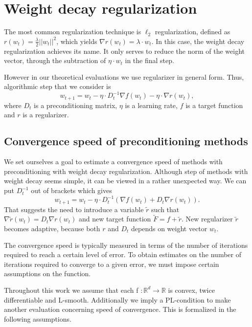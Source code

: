 \documentclass{article}
\begin{document}
\section{Weight decay regularization} 

The most common regularization technique is $\ell_2$ regularization, defined as $r(w_t) = \frac{\lambda}{2} ||w_t||^2$, which yields $\nabla r (w_t) = \lambda \cdot w_t$.
In this case, the weight decay regularization achieves its name.
It only serves to reduce the norm of the weight vector, through the subtraction of $\eta \cdot w_t$ in the final step.

However in our theoretical evaluations we use regularizer in general form.
Thus, algorithmic step that we consider is 
\begin{equation}
w_{t+1} = w_t - \eta \cdot D_t^{-1} \nabla f(w_t) - \eta \cdot \nabla r(w_t),
\end{equation}
where $D_t$ is a preconditioning matrix, $\eta$ is a learning rate, $f$ is a target function and $r$ is a regularizer.


\subsection{Convergence speed of preconditioning methods}

We set ourselves a goal to estimate a convergence speed of methods with preconditioning with weight decay regularization.
Although step of methods with weight decay seems simple, it can be viewed in a rather unexpected way. We can put $D_t^{-1}$ out of brackets which gives
\begin{equation}
w_{t+1} = w_t - \eta \cdot D_t^{-1} (\nabla f(w_t) + D_t \nabla r(w_t)).
\end{equation}
That suggests the need to introduce a variable $\tilde{r}$ such that $\nabla \tilde{r}(w_t) = D_t \nabla r(w_t)$ and new target function $\tilde{F} = f + \tilde{r}$. New regularizer $\tilde{r}$ becomes adaptive, because both $r$ and $D_t$ depends on weight vector $w_t$.

The convergence speed is typically measured in terms of the number of iterations required to reach a certain level of error.
To obtain estimates on the number of iterations required to converge to a given error, we must impose certain assumptions on the function.

Throughout this work we assume that each f $:\mathbb{R}^d \rightarrow \mathbb{R}$ is convex, twice differentiable and L-smooth.
Additionally we imply a PL-condition to make another evaluation concerning speed of convergence.
This is formalized in the following assumptions.
\end{document}
